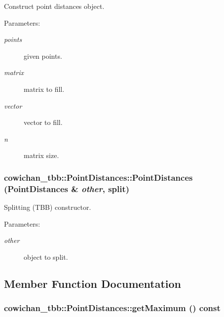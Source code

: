 Construct point distances object. \begin{Desc}
\item[Parameters:]
\begin{description}
\item[{\em points}]given points. \item[{\em matrix}]matrix to fill. \item[{\em vector}]vector to fill. \item[{\em n}]matrix size. \end{description}
\end{Desc}
\hypertarget{classcowichan__tbb_1_1_point_distances_417faef7b5cb360d0299cf4faacf9dd7}{
\subsubsection[{PointDistances}]{\setlength{\rightskip}{0pt plus 5cm}cowichan\_\-tbb::PointDistances::PointDistances ({\bf PointDistances} \& {\em other}, \/  split)}}
\label{classcowichan__tbb_1_1_point_distances_417faef7b5cb360d0299cf4faacf9dd7}


Splitting (TBB) constructor. \begin{Desc}
\item[Parameters:]
\begin{description}
\item[{\em other}]object to split. \end{description}
\end{Desc}


\subsection{Member Function Documentation}
\hypertarget{classcowichan__tbb_1_1_point_distances_bd1df7d38eaed63a1d44c3aab93f16d5}{
\subsubsection[{getMaximum}]{ cowichan\_\-tbb::PointDistances::getMaximum () const}}
\label{classcowichan__tbb_1_1_point_distances_bd1df7d38eaed63a1d44c3aab93f16d5}



